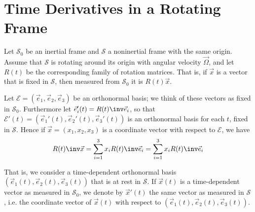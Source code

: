 \documentclass[article, a4paper, 11pt, oneside]{memoir}
\numberwithin{equation}{chapter}
\newcommand{\calE}{\mathcal{E}}
\begin{document}
\section{Time Derivatives in a Rotating Frame}

\newcommand{\calS}{\mathcal{S}}

Let $\calS_0$ be an inertial frame and $\calS$ a noninertial frame with the same origin. Assume that $\calS$ is rotating around its origin with angular velocity $\vec{\Omega}$, and let $R(t)$ be the corresponding family of rotation matrices. That is, if $\vec{x}$ is a vector that is fixed in $\calS$, then measured from $\calS_0$ it is $R(t) \vec{x}$.

Let $\calE = (\vec{e}_1, \vec{e}_2, \vec{e}_3)$ be an orthonormal basis; we think of these vectors as fixed in $\calS_0$. Furthermore let $\vec{e}_i'(t) = R(t)\inv \vec{e}_i$, so that $\calE'(t) = (\vec{e}_1'(t), \vec{e}_2'(t), \vec{e}_3'(t))$ is an orthonormal basis for each $t$, fixed in $\calS$. Hence if $\vec{x} = (x_1, x_2, x_3)$ is a coordinate vector with respect to $\calE$, we have
%
\begin{equation*}
    R(t)\inv \vec{x} = \sum_{i=1}^3 x_i R(t)\inv \vec{e}_i
        = \sum_{i=1}^3 x_i R(t)\inv \vec{e}_i
\end{equation*}

That is, we consider a time-dependent orthonormal basis $(\vec{e}_1(t), \vec{e}_2(t), \vec{e}_3(t))$ that is at rest in $\calS$. If $\vec{x}(t)$ is a time-dependent vector as measured in $\calS_0$, we denote by $\vec{x}'(t)$ the same vector as measured in $\calS$, i.e. the coordinate vector of $\vec{x}(t)$ with respect to $(\vec{e}_1(t), \vec{e}_2(t), \vec{e}_3(t))$.
\end{document}
